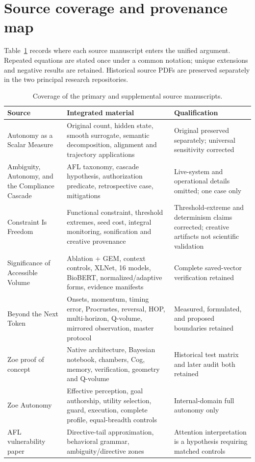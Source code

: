 \section{Source coverage and provenance map}
\label{app:source-coverage}
Table~\ref{tab:source-coverage} records where each source manuscript enters the unified argument. Repeated equations are stated once under a common notation; unique extensions and negative results are retained. Historical source PDFs are preserved separately in the two principal research repositories.
\begin{table}[htbp]
\centering
\caption{Coverage of the primary and supplemental source manuscripts.}
\label{tab:source-coverage}
{\scriptsize
\begin{tabularx}{\textwidth}{p{4.0cm}Xp{3.5cm}}
\toprule
Source&Integrated material&Qualification\\
\midrule
Autonomy as a Scalar Measure&Original count, hidden state, smooth surrogate, semantic decomposition, alignment and trajectory applications&Original preserved separately; universal sensitivity corrected\\
Ambiguity, Autonomy, and the Compliance Cascade&AFL taxonomy, cascade hypothesis, authorization predicate, retrospective case, mitigations&Live-system and operational details omitted; one case only\\
Constraint Is Freedom&Functional constraint, threshold extremes, seed cost, integral monitoring, sonification and creative provenance&Threshold-extreme and determinism claims corrected; creative artifacts not scientific validation\\
Significance of Accessible Volume&Ablation + GEM, context controls, XLNet, 16 models, BioBERT, normalized/adaptive forms, evidence manifests&Complete saved-vector verification retained\\
Beyond the Next Token&Onsets, momentum, timing error, Procrustes, reversal, HOP, multi-horizon, Q-volume, mirrored observation, master protocol&Measured, formulated, and proposed boundaries retained\\
Zoe proof of concept&Native architecture, Bayesian notebook, chambers, Cog, memory, verification, geometry and Q-volume&Historical test matrix and later audit both retained\\
Zoe Autonomy&Effective perception, goal authorship, utility selection, guard, execution, complete profile, equal-breadth controls&Internal-domain full autonomy only\\
AFL vulnerability paper&Directive-tail approximation, behavioral grammar, ambiguity/directive zones&Attention interpretation is a hypothesis requiring matched controls\\

\end{tabularx}}
\end{table}
